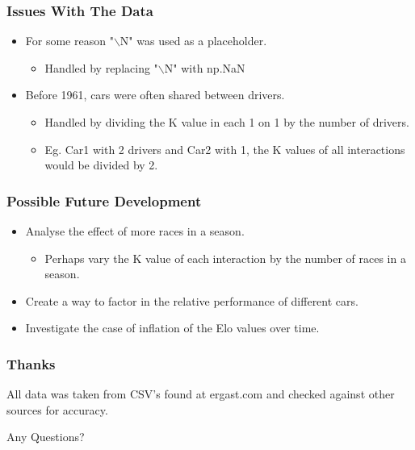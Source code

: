 \documentclass{beamer}
\begin{document}
\begin{frame}
    \frametitle{Issues With The Data}
    \begin{itemize}
        \item For some reason "$\backslash$N" was used as a placeholder.
        \begin{itemize}
            \item Handled by replacing "$\backslash$N" with np.NaN
        \end{itemize}
        \item Before 1961, cars were often shared between drivers.
        \begin{itemize}
            \item Handled by dividing the K value in each 1 on 1 by the number of drivers.
            \item Eg. Car1 with 2 drivers and Car2 with 1, the K values of all interactions would be divided by 2.
        \end{itemize}
    \end{itemize}
\end{frame}

\begin{frame}
    \frametitle{Possible Future Development}
    \begin{itemize}
        \item Analyse the effect of more races in a season.
        \begin{itemize}
            \item Perhaps vary the K value of each interaction by the number of races in a season.
        \end{itemize}
        \item Create a way to factor in the relative performance of different cars.
        \item Investigate the case of inflation of the Elo values over time. 
    \end{itemize}
\end{frame}


\begin{frame}
    \frametitle{Thanks}
    \begin{center}
        All data was taken from CSV's found at ergast.com and checked against other sources for accuracy.
    
        \LARGE{Any Questions?}
    \end{center}
\end{frame}
\end{document}
